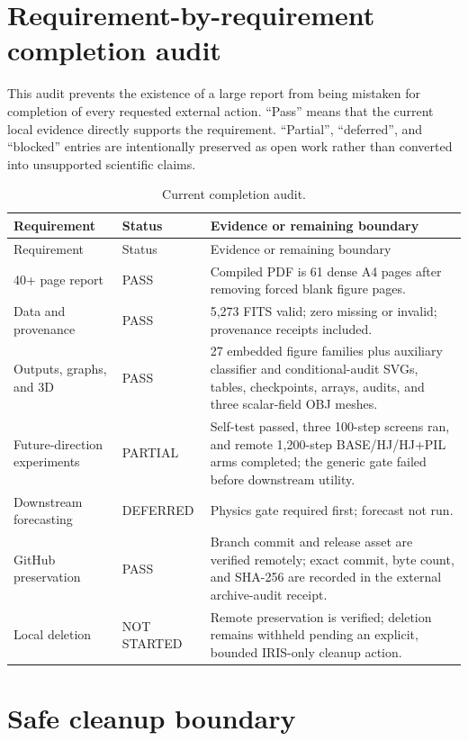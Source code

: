 \documentclass[11pt,oneside]{report}
\begin{document}
\section{Requirement-by-requirement completion audit}

This audit prevents the existence of a large report from being mistaken for completion of every requested external action. ``Pass'' means that the current local evidence directly supports the requirement. ``Partial'', ``deferred'', and ``blocked'' entries are intentionally preserved as open work rather than converted into unsupported scientific claims.

\begin{longtable}{p{}p{}p{}}
\caption{Current completion audit.}\label{tab:completion-audit}\\
\toprule
Requirement & Status & Evidence or remaining boundary \\
\midrule
\endfirsthead
\toprule
Requirement & Status & Evidence or remaining boundary \\
\midrule
\endhead
40+ page report & PASS & Compiled PDF is 61 dense A4 pages after removing forced blank figure pages. \\
Data and provenance & PASS & 5,273 FITS valid; zero missing or invalid; provenance receipts included. \\
Outputs, graphs, and 3D & PASS & 27 embedded figure families plus auxiliary classifier and conditional-audit SVGs, tables, checkpoints, arrays, audits, and three scalar-field OBJ meshes. \\
Future-direction experiments & PARTIAL & Self-test passed, three 100-step screens ran, and remote 1,200-step BASE/HJ/HJ+PIL arms completed; the generic gate failed before downstream utility. \\
Downstream forecasting & DEFERRED & Physics gate required first; forecast not run. \\
GitHub preservation & PASS & Branch commit and release asset are verified remotely; exact commit, byte count, and SHA-256 are recorded in the external archive-audit receipt. \\
Local deletion & NOT STARTED & Remote preservation is verified; deletion remains withheld pending an explicit, bounded IRIS-only cleanup action. \\
\bottomrule
\end{longtable}

\section{Safe cleanup boundary}
\end{document}
